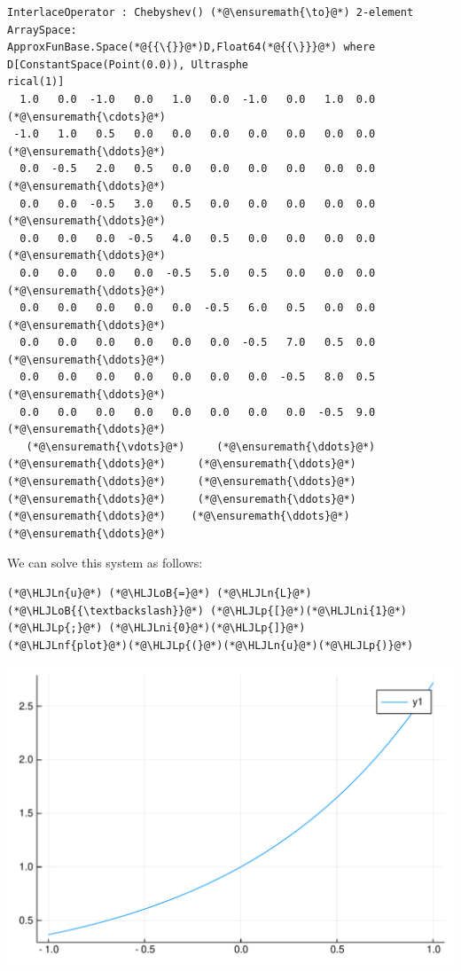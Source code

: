 \documentclass[12pt,a4paper]{article}
\newcommand{\HLJLn}[1]{#1}
\newcommand{\HLJLnf}[1]{\textcolor[RGB]{66,102,213}{#1}}
\newcommand{\HLJLni}[1]{\textcolor[RGB]{59,151,46}{#1}}
\newcommand{\HLJLoB}[1]{\textcolor[RGB]{102,102,102}{\textbf{#1}}}
\newcommand{\HLJLp}[1]{#1}
\begin{document}
\begin{lstlisting}
InterlaceOperator : Chebyshev() (*@\ensuremath{\to}@*) 2-element ArraySpace:
ApproxFunBase.Space(*@{{\{}}@*)D,Float64(*@{{\}}}@*) where D[ConstantSpace(Point(0.0)), Ultrasphe
rical(1)]
  1.0   0.0  -1.0   0.0   1.0   0.0  -1.0   0.0   1.0  0.0  (*@\ensuremath{\cdots}@*)
 -1.0   1.0   0.5   0.0   0.0   0.0   0.0   0.0   0.0  0.0  (*@\ensuremath{\ddots}@*)
  0.0  -0.5   2.0   0.5   0.0   0.0   0.0   0.0   0.0  0.0  (*@\ensuremath{\ddots}@*)
  0.0   0.0  -0.5   3.0   0.5   0.0   0.0   0.0   0.0  0.0  (*@\ensuremath{\ddots}@*)
  0.0   0.0   0.0  -0.5   4.0   0.5   0.0   0.0   0.0  0.0  (*@\ensuremath{\ddots}@*)
  0.0   0.0   0.0   0.0  -0.5   5.0   0.5   0.0   0.0  0.0  (*@\ensuremath{\ddots}@*)
  0.0   0.0   0.0   0.0   0.0  -0.5   6.0   0.5   0.0  0.0  (*@\ensuremath{\ddots}@*)
  0.0   0.0   0.0   0.0   0.0   0.0  -0.5   7.0   0.5  0.0  (*@\ensuremath{\ddots}@*)
  0.0   0.0   0.0   0.0   0.0   0.0   0.0  -0.5   8.0  0.5  (*@\ensuremath{\ddots}@*)
  0.0   0.0   0.0   0.0   0.0   0.0   0.0   0.0  -0.5  9.0  (*@\ensuremath{\ddots}@*)
   (*@\ensuremath{\vdots}@*)     (*@\ensuremath{\ddots}@*)     (*@\ensuremath{\ddots}@*)     (*@\ensuremath{\ddots}@*)     (*@\ensuremath{\ddots}@*)     (*@\ensuremath{\ddots}@*)     (*@\ensuremath{\ddots}@*)     (*@\ensuremath{\ddots}@*)     (*@\ensuremath{\ddots}@*)    (*@\ensuremath{\ddots}@*)   (*@\ensuremath{\ddots}@*)
\end{lstlisting}


We can solve this system as follows:


\begin{lstlisting}
(*@\HLJLn{u}@*) (*@\HLJLoB{=}@*) (*@\HLJLn{L}@*) (*@\HLJLoB{{\textbackslash}}@*) (*@\HLJLp{[}@*)(*@\HLJLni{1}@*)(*@\HLJLp{;}@*) (*@\HLJLni{0}@*)(*@\HLJLp{]}@*)
(*@\HLJLnf{plot}@*)(*@\HLJLp{(}@*)(*@\HLJLn{u}@*)(*@\HLJLp{)}@*)
\end{lstlisting}

\includegraphics[width=\linewidth]{figures/Lecture22_9_1.pdf}
\end{document}
